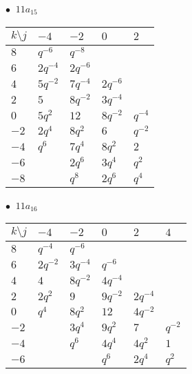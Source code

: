 \begin{minipage}{\linewidth}
$\bullet\ $ $11a_{15}$ \vspace{0.5em} \\
\begin{tabular}{l|llll}
$k \setminus j$ & $-4$ & $-2$ & $0$ & $2$ \\
\hline
$8$ & $q^{-6}$ & $q^{-8}$ &  &  \\
$6$ & $2q^{-4}$ & $2q^{-6}$ &  &  \\
$4$ & $5q^{-2}$ & $7q^{-4}$ & $2q^{-6}$ &  \\
$2$ & $5$ & $8q^{-2}$ & $3q^{-4}$ &  \\
$0$ & $5q^{2}$ & $12$ & $8q^{-2}$ & $q^{-4}$ \\
$-2$ & $2q^{4}$ & $8q^{2}$ & $6$ & $q^{-2}$ \\
$-4$ & $q^{6}$ & $7q^{4}$ & $8q^{2}$ & $2$ \\
$-6$ &  & $2q^{6}$ & $3q^{4}$ & $q^{2}$ \\
$-8$ &  & $q^{8}$ & $2q^{6}$ & $q^{4}$ \\
\end{tabular}
\vspace{2em}
\end{minipage}
%
\begin{minipage}{\linewidth}
$\bullet\ $ $11a_{16}$ \vspace{0.5em} \\
\begin{tabular}{l|lllll}
$k \setminus j$ & $-4$ & $-2$ & $0$ & $2$ & $4$ \\
\hline
$8$ & $q^{-4}$ & $q^{-6}$ &  &  &  \\
$6$ & $2q^{-2}$ & $3q^{-4}$ & $q^{-6}$ &  &  \\
$4$ & $4$ & $8q^{-2}$ & $4q^{-4}$ &  &  \\
$2$ & $2q^{2}$ & $9$ & $9q^{-2}$ & $2q^{-4}$ &  \\
$0$ & $q^{4}$ & $8q^{2}$ & $12$ & $4q^{-2}$ &  \\
$-2$ &  & $3q^{4}$ & $9q^{2}$ & $7$ & $q^{-2}$ \\
$-4$ &  & $q^{6}$ & $4q^{4}$ & $4q^{2}$ & $1$ \\
$-6$ &  &  & $q^{6}$ & $2q^{4}$ & $q^{2}$ \\
\end{tabular}
\vspace{2em}
\end{minipage}
%
